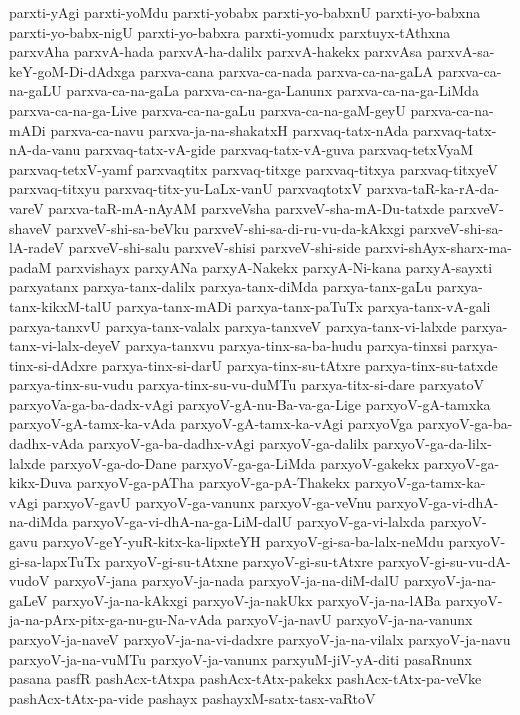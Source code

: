 {parxti-yAgi
parxti-yoMdu
parxti-yobabx
parxti-yo-babxnU
parxti-yo-babxna
parxti-yo-babx-nigU
parxti-yo-babxra
parxti-yomudx
parxtuyx-tAthxna
parxvAha
parxvA-hada
parxvA-ha-dalilx
parxvA-hakekx
parxvAsa
parxvA-sa-keY-goM-Di-dAdxga
parxva-cana
parxva-ca-nada
parxva-ca-na-gaLA
parxva-ca-na-gaLU
parxva-ca-na-gaLa
parxva-ca-na-ga-Lanunx
parxva-ca-na-ga-LiMda
parxva-ca-na-ga-Live
parxva-ca-na-gaLu
parxva-ca-na-gaM-geyU
parxva-ca-na-mADi
parxva-ca-navu
parxva-ja-na-shakatxH
parxvaq-tatx-nAda
parxvaq-tatx-nA-da-vanu
parxvaq-tatx-vA-gide
parxvaq-tatx-vA-guva
parxvaq-tetxVyaM
parxvaq-tetxV-yamf
parxvaqtitx
parxvaq-titxge
parxvaq-titxya
parxvaq-titxyeV
parxvaq-titxyu
parxvaq-titx-yu-LaLx-vanU
parxvaqtotxV
parxva-taR-ka-rA-da-vareV
parxva-taR-mA-nAyAM
parxveVsha
parxveV-sha-mA-Du-tatxde
parxveV-shaveV
parxveV-shi-sa-beVku
parxveV-shi-sa-di-ru-vu-da-kAkxgi
parxveV-shi-sa-lA-radeV
parxveV-shi-salu
parxveV-shisi
parxveV-shi-side
parxvi-shAyx-sharx-ma-padaM
parxvishayx
parxyANa
parxyA-Nakekx
parxyA-Ni-kana
parxyA-sayxti
parxyatanx
parxya-tanx-dalilx
parxya-tanx-diMda
parxya-tanx-gaLu
parxya-tanx-kikxM-talU
parxya-tanx-mADi
parxya-tanx-paTuTx
parxya-tanx-vA-gali
parxya-tanxvU
parxya-tanx-valalx
parxya-tanxveV
parxya-tanx-vi-lalxde
parxya-tanx-vi-lalx-deyeV
parxya-tanxvu
parxya-tinx-sa-ba-hudu
parxya-tinxsi
parxya-tinx-si-dAdxre
parxya-tinx-si-darU
parxya-tinx-su-tAtxre
parxya-tinx-su-tatxde
parxya-tinx-su-vudu
parxya-tinx-su-vu-duMTu
parxya-titx-si-dare
parxyatoV
parxyoVa-ga-ba-dadx-vAgi
parxyoV-gA-nu-Ba-va-ga-Lige
parxyoV-gA-tamxka
parxyoV-gA-tamx-ka-vAda
parxyoV-gA-tamx-ka-vAgi
parxyoVga
parxyoV-ga-ba-dadhx-vAda
parxyoV-ga-ba-dadhx-vAgi
parxyoV-ga-dalilx
parxyoV-ga-da-lilx-lalxde
parxyoV-ga-do-Dane
parxyoV-ga-ga-LiMda
parxyoV-gakekx
parxyoV-ga-kikx-Duva
parxyoV-ga-pATha
parxyoV-ga-pA-Thakekx
parxyoV-ga-tamx-ka-vAgi
parxyoV-gavU
parxyoV-ga-vanunx
parxyoV-ga-veVnu
parxyoV-ga-vi-dhA-na-diMda
parxyoV-ga-vi-dhA-na-ga-LiM-dalU
parxyoV-ga-vi-lalxda
parxyoV-gavu
parxyoV-geY-yuR-kitx-ka-lipxteYH
parxyoV-gi-sa-ba-lalx-neMdu
parxyoV-gi-sa-lapxTuTx
parxyoV-gi-su-tAtxne
parxyoV-gi-su-tAtxre
parxyoV-gi-su-vu-dA-vudoV
parxyoV-jana
parxyoV-ja-nada
parxyoV-ja-na-diM-dalU
parxyoV-ja-na-gaLeV
parxyoV-ja-na-kAkxgi
parxyoV-ja-nakUkx
parxyoV-ja-na-lABa
parxyoV-ja-na-pArx-pitx-ga-nu-gu-Na-vAda
parxyoV-ja-navU
parxyoV-ja-na-vanunx
parxyoV-ja-naveV
parxyoV-ja-na-vi-dadxre
parxyoV-ja-na-vilalx
parxyoV-ja-navu
parxyoV-ja-na-vuMTu
parxyoV-ja-vanunx
parxyuM-jiV-yA-diti
pasaRnunx
pasana
pasfR
pashAcx-tAtxpa
pashAcx-tAtx-pakekx
pashAcx-tAtx-pa-veVke
pashAcx-tAtx-pa-vide
pashayx
pashayxM-satx-tasx-vaRtoV
}
